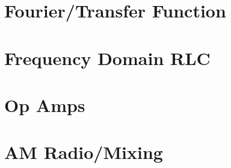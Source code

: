 \documentclass[12pt]{article}
\begin{document}

\section*{Fourier/Transfer Function}


\section*{Frequency Domain RLC}


\section*{Op Amps}


\section*{AM Radio/Mixing}

\end{document}
